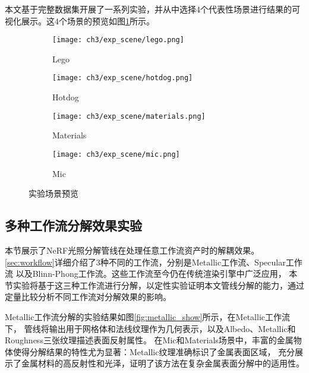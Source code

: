 本文基于完整数据集开展了一系列实验，并从中选择4个代表性场景进行结果的可视化展示。这4个场景的预览如图\ref{fig:exp_scene}所示。

\begin{figure}[H]
  \centering
  \begin{subfigure}[t]{0.24\textwidth}
    \centering
    \texttt{[image: ch3/exp\_scene/lego.png]}
    \caption{Lego}
  \end{subfigure}
  \begin{subfigure}[t]{0.24\textwidth}
    \centering
    \texttt{[image: ch3/exp\_scene/hotdog.png]}
    \caption{Hotdog}
  \end{subfigure}
  \begin{subfigure}[t]{0.24\textwidth}
    \centering
    \texttt{[image: ch3/exp\_scene/materials.png]}
    \caption{Materials}
  \end{subfigure}
  \begin{subfigure}[t]{0.24\textwidth}
    \centering
    \texttt{[image: ch3/exp\_scene/mic.png]}
    \caption{Mic}
  \end{subfigure}
  \caption{实验场景预览}
  \label{fig:exp_scene}
\end{figure}

\subsection{多种工作流分解效果实验}
本节展示了NeRF光照分解管线在处理任意工作流资产时的解耦效果。
\ref{sec:workflow}详细介绍了3种不同的工作流，分别是Metallic工作流、Specular工作流
以及Blinn-Phong工作流。这些工作流至今仍在传统渲染引擎中广泛应用，
本节实验将基于这三种工作流进行分解，以定性实验证明本文管线分解的能力，通过定量比较分析不同工作流对分解效果的影响。

\newpage

Metallic工作流分解的实验结果如图\ref{fig:metallic_show}所示，在Metallic工作流下，
管线将输出用于网格体和法线纹理作为几何表示，以及Albedo、Metallic和Roughness三张纹理描述表面反射属性。
在Mic和Materials场景中，丰富的金属物体使得分解结果的特性尤为显著：Metallic纹理准确标识了金属表面区域，
充分展示了金属材料的高反射性和光泽，证明了该方法在复杂金属表面分解中的适用性。

